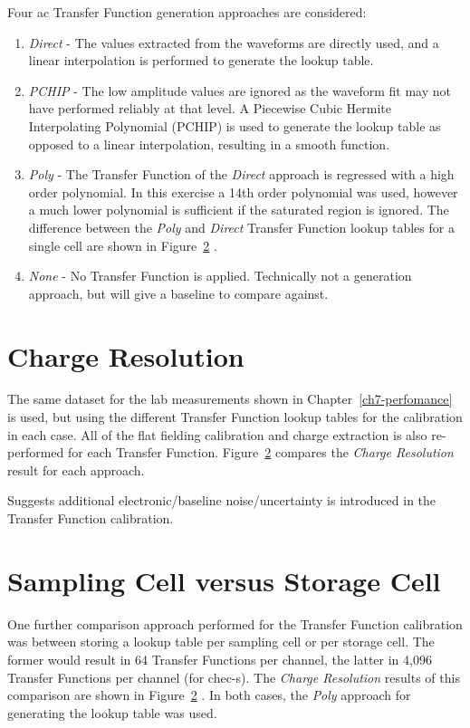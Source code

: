 Four \gls{ac} Transfer Function generation approaches are considered:
\begin{enumerate}
\item \textit{Direct} - The values extracted from the waveforms are directly used, and a linear interpolation is performed to generate the lookup table.
\item \textit{PCHIP} - The low amplitude values are ignored as the waveform fit may not have performed reliably at that level. A Piecewise Cubic Hermite Interpolating Polynomial (PCHIP) is used to generate the lookup table as opposed to a linear interpolation, resulting in a smooth function.
\item \textit{Poly} - The Transfer Function of the \textit{Direct} approach is regressed with a high order polynomial. In this exercise a 14th order polynomial was used, however a much lower polynomial is sufficient if the saturated region is ignored. The difference between the \textit{Poly} and \textit{Direct} Transfer Function lookup tables for a single cell are shown in Figure~\ref{} .
\item \textit{None} - No Transfer Function is applied. Technically not a generation approach, but will give a baseline to compare against.
\end{enumerate}

\section{Charge Resolution}

The same dataset for the lab measurements shown in Chapter~\ref{ch7-perfomance} is used, but using the different Transfer Function lookup tables for the calibration in each case. All of the flat fielding calibration and charge extraction is also re-performed for each Transfer Function. Figure~\ref{}  compares the \textit{Charge Resolution} result for each approach.


Suggests additional electronic/baseline noise/uncertainty is introduced in the Transfer Function calibration.

\section{Sampling Cell versus Storage Cell}

One further comparison approach performed for the Transfer Function calibration was between storing a lookup table per sampling cell or per storage cell. The former would result in 64 Transfer Functions per channel, the latter in 4,096 Transfer Functions per channel (for \gls{chec-s}). The \textit{Charge Resolution} results of this comparison are shown in Figure~\ref{} . In both cases, the \textit{Poly} approach for generating the lookup table was used.

